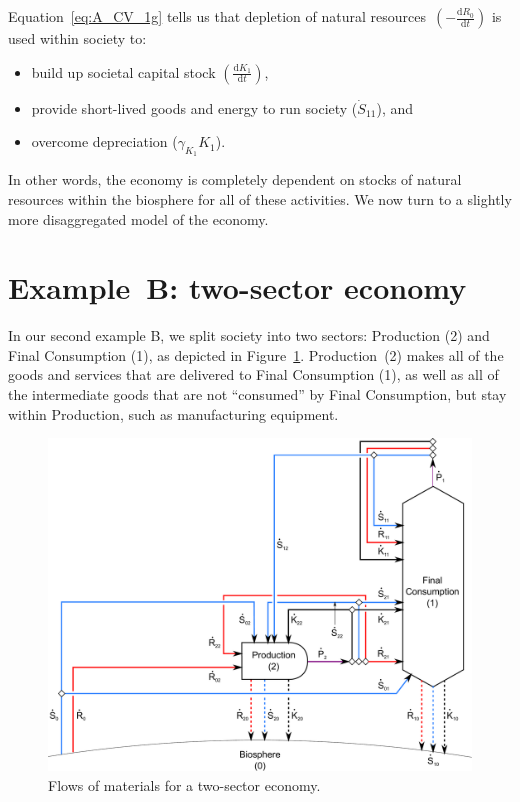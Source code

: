 Equation~\ref{eq:A_CV_1g} tells us that depletion of
natural resources~$\left(-\frac{\mathrm{d}R_{0}}{\mathrm{d}t}\right)$
is used within society to:

\begin{itemize}
	\item build up societal capital stock 
	$\left(\frac{\mathrm{d}K_{1}}{\mathrm{d}t}\right)$,
	\item provide short-lived goods and energy to 
	run society ($\dot{S}_{11}$), and
	\item overcome depreciation
	($\gamma_{K_{1}}{K}_{1}$).
\end{itemize}
\noindent{}In other words,
the economy is completely dependent on stocks of natural resources
within the biosphere for all of these activities.
We now turn to a slightly more disaggregated model of the economy.


\section{Example~B: two-sector economy} %
\label{sec:B_materials}

In our second example B, we split society into two sectors: 
Production (2) and Final Consumption (1), 
as depicted in Figure~\ref{fig:B_materials}. 
Production~(2) makes all of the goods and services 
that are delivered to Final Consumption (1), 
as well as all of the intermediate goods that are not ``consumed'' 
by Final Consumption, 
but stay within Production, 
such as manufacturing equipment.

\begin{landscape}
\begin{figure}[!ht]
\centering
\includegraphics[width=0.8\linewidth]{Part_1/Chapter_Materials/images/2_sector_materials.pdf}
\caption[Flows of materials for a two-sector economy]{Flows of materials for a two-sector economy.}
\label{fig:B_materials}
\end{figure}
\end{landscape}

